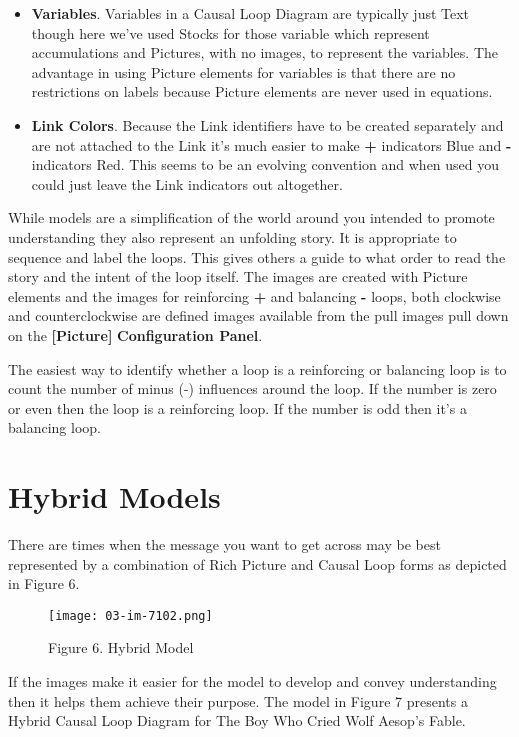 \documentclass[]{memoir}
\let\Oldincludegraphics\includegraphics
\renewcommand{\includegraphics}[1]{\Oldincludegraphics[max size={\textwidth}{\textheight}]{#1}}
\newcommand{\p}[1]{\textbf{{[}#1{]}}}
\renewcommand{\u}[1]{\textbf{#1}}
\begin{document}
\begin{itemize}
\itemsep1pt\parskip0pt
\item
  \textbf{Variables}. Variables in a Causal Loop Diagram are typically
  just Text though here we've used Stocks for those variable which
  represent accumulations and Pictures, with no images, to represent the
  variables. The advantage in using Picture elements for variables is
  that there are no restrictions on labels because Picture elements are
  never used in equations.
\item
  \textbf{Link Colors}. Because the Link identifiers have to be created
  separately and are not attached to the Link it's much easier to make
  \textbf{+} indicators Blue and \textbf{-} indicators Red. This seems
  to be an evolving convention and when used you could just leave the
  Link indicators out altogether.
\end{itemize}

While models are a simplification of the world around you intended to
promote understanding they also represent an unfolding story. It is
appropriate to sequence and label the loops. This gives others a guide
to what order to read the story and the intent of the loop itself. The
images are created with Picture elements and the images for reinforcing
\textbf{+} and balancing \textbf{-} loops, both clockwise and
counterclockwise are defined images available from the pull images pull
down on the \p{Picture} \u{Configuration Panel}.

The easiest way to identify whether a loop is a reinforcing or balancing
loop is to count the number of minus (-) influences around the loop. If
the number is zero or even then the loop is a reinforcing loop. If the
number is odd then it's a balancing loop.

\section{Hybrid Models}

There are times when the message you want to get across may be best
represented by a combination of Rich Picture and Causal Loop forms as
depicted in Figure 6.

\begin{figure}[htbp]
\centering
\texttt{[image: 03-im-7102.png]}
\caption{Figure 6. Hybrid Model}
\end{figure}

If the images make it easier for the model to develop and convey
understanding then it helps them achieve their purpose. The model in
Figure 7 presents a Hybrid Causal Loop Diagram for The Boy Who Cried
Wolf Aesop's Fable.
\end{document}
